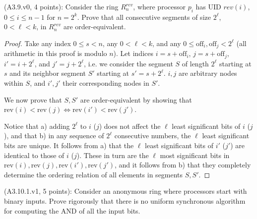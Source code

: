 \newcommand{\off}[1]{\text{off}_{#1}}
\newcommand{\rev}[1]{\text{rev}(#1)}

\begin{Exc}{(A3.9.v0, 4 points):}
Consider the ring $R_n^{rev}$, where processor $p_i$ has UID
$rev(i)$, $0\leq i \leq n-1$ for $n=2^k$. Prove that all
consecutive segments of size $2^\ell$, $0<\ell < k$, in $R_n^{rev}$
are order-equivalent.
\end{Exc}

\begin{proof}
Take any index $0 \leq s < n$, any $0 < \ell < k$, and any $0 \leq \off{i}, \off{j} < 2^\ell$ (all
arithmetic in this proof is modulo $n$).
Let indices $i = s + \off{i}$, $j = s + \off{j}$, $i' = i + 2^\ell$, and $j' = j + 2^\ell$, i.e.
we consider the segment $S$ of length $2^\ell$ starting at $s$ and its neighbor segment $S'$ starting
at $s' = s + 2^\ell$. $i, j$ are arbitrary nodes within $S$, and $i', j'$ their corresponding nodes
in $S'$.

We now prove that $S, S'$ are order-equivalent by showing that
$\rev{i} < \rev{j} \iff \rev{i'} < \rev{j'}$.

Notice that a) adding $2^\ell$ to $i$ ($j$) does not affect the $\ell$ least significant bits of $i$ ($j$),
and that b) in any sequence of $2^\ell$ consecutive numbers, the $\ell$ least significant bits are unique.
It follows from a) that the $\ell$ least significant bits of $i'$ ($j'$) are identical to those of
$i$ ($j$). These in turn are the $\ell$ most significant bits in $\rev{i}, \rev{j}, \rev{i'}, \rev{j'}$,
and it follows from b) that they completely determine the ordering relation of all elements in segments
$S, S'$.
\end{proof}


\begin{Exc}{(A3.10.1.v1, 5 points):}
Consider an anonymous ring where processors start with binary
inputs. Prove rigorously that there is no uniform synchronous
algorithm for computing the AND of all the input bits.
\end{Exc}

